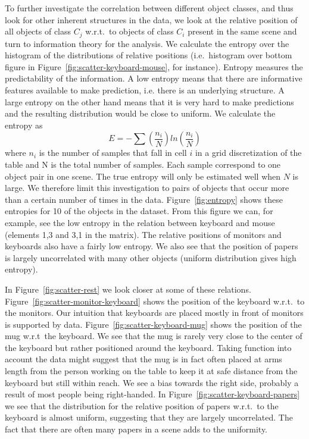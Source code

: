 \documentclass[letterpaper, 10 pt, conference]{ieeeconf}  %
\begin{document}
To further investigate the correlation between different object classes, and thus look for other inherent structures in the data, we look at 
the relative position of all objects of class $C_j$ w.r.t.\ to objects of class $C_i$ present in the same scene and turn to information theory for the analysis. We calculate the entropy over the histogram of the distributions of relative positions (i.e.\ histogram over bottom figure in Figure~\ref{fig:scatter-keyboard-mouse}, for instance). Entropy measures the predictability of the information. A low entropy means that there are informative features available to make prediction, i.e. there is an underlying structure. A large entropy on the other hand means that it is very hard to make predictions and the resulting distribution would be close to uniform.
We calculate the entropy as 
\begin{equation}
E=-\sum (\frac{n_i}{N})ln(\frac{n_i}{N})
\end{equation}
where $n_i$ is the number of samples that fall in cell $i$ in a grid discretization of the table and N is the total number of samples. Each 
sample correspond to one object pair in one scene. The true entropy will only be estimated well when $N$ is large. We therefore limit this 
investigation to pairs of objects that occur more than a certain number of times in the data. Figure~\ref{fig:entropy} shows these entropies 
for 10 of the objects in the dataset. From this figure we can, for example, see the low entropy in the relation between keyboard and mouse (elements 1,3 and 3,1 in the matrix). The relative positions of monitors and keyboards also have a fairly low entropy. We also see that the 
position of papers is largely uncorrelated with many other objects (uniform distribution gives high entropy). 

In Figure~\ref{fig:scatter-rest} we look closer at some of these relations. Figure~\ref{fig:scatter-monitor-keyboard} shows the position of 
the keyboard w.r.t.\ to the monitors. Our intuition that keyboards are placed mostly in front of monitors is supported by data. 
Figure~\ref{fig:scatter-keyboard-mug} shows the position of the mug w.r.t\ the keyboard. We see that the mug is rarely very close to the center of the 
keyboard but rather positioned around the keyboard. Taking function into account the data might suggest that the mug 
is in fact often placed at arms length from the person working on the table to keep it at safe distance from the keyboard but still within 
reach. We see a bias towards the right side, probably a result of most people being right-handed. In Figure~\ref{fig:scatter-keyboard-papers} we see 
that the distribution for the relative position of papers w.r.t.\ to the keyboard is almost uniform, suggesting that they are largely uncorrelated. The fact that there are often many papers in a scene adds to the uniformity.
\end{document}

